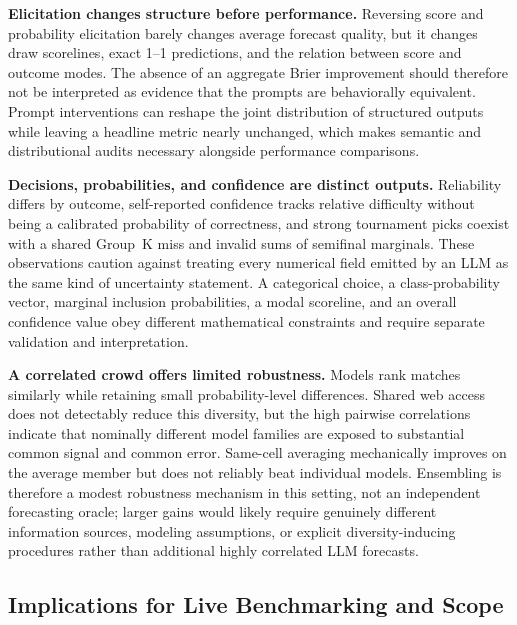 \begin{draftbullets}
  \item \textbf{Elicitation changes structure before performance.} Reversing score and probability
  elicitation barely changes average forecast quality, but it changes draw scorelines, exact 1--1
  predictions, and the relation between score and outcome modes. The absence of an aggregate Brier
  improvement should therefore not be interpreted as evidence that the prompts are behaviorally
  equivalent. Prompt interventions can reshape the joint distribution of structured outputs while
  leaving a headline metric nearly unchanged, which makes semantic and distributional audits necessary
  alongside performance comparisons.

  \item \textbf{Decisions, probabilities, and confidence are distinct outputs.} Reliability differs by
  outcome, self-reported confidence tracks relative difficulty without being a calibrated probability
  of correctness, and strong tournament picks coexist with a shared Group~K miss and invalid sums of
  semifinal marginals. These observations caution against treating every numerical field emitted by
  an LLM as the same kind of uncertainty statement. A categorical choice, a class-probability vector,
  marginal inclusion probabilities, a modal scoreline, and an overall confidence value obey different
  mathematical constraints and require separate validation and interpretation.

  \item \textbf{A correlated crowd offers limited robustness.} Models rank matches similarly while
  retaining small probability-level differences. Shared web access does not detectably reduce this
  diversity, but the high pairwise correlations indicate that nominally different model families are
  exposed to substantial common signal and common error. Same-cell averaging mechanically improves
  on the average member but does not reliably beat individual models. Ensembling is therefore a modest
  robustness mechanism in this setting, not an independent forecasting oracle; larger gains would
  likely require genuinely different information sources, modeling assumptions, or explicit
  diversity-inducing procedures rather than additional highly correlated LLM forecasts.
\end{draftbullets}

\subsection{Implications for Live Benchmarking and Scope}
\label{sec:discussion-benchmarking}

